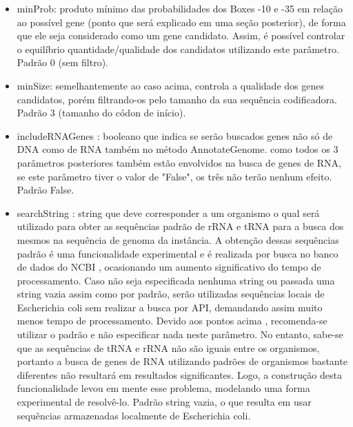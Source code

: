 \documentclass[brazilian,12pt,a4paper,final]{article}
\begin{document}
	\vspace{0.5cm}
		
	\begin{itemize}
		\item minProb: produto mínimo das probabilidades dos Boxes -10 e -35 em relação ao possível gene (ponto
						que será explicado em uma seção posterior), de forma que ele seja
						considerado como um gene candidato. Assim, é possível controlar o equilíbrio quantidade/qualidade
						dos candidatos utilizando este parâmetro. Padrão 0 (sem filtro).
						
		\item minSize: semelhantemente ao caso acima, controla a qualidade dos genes candidatos, porém filtrando-os pelo
						tamanho da sua sequência codificadora. Padrão 3 (tamanho do códon de início).
						
		\item includeRNAGenes : booleano que indica se serão buscados genes não só de DNA como de RNA também no método 
								AnnotateGenome. como todos os 3 parâmetros posteriores também estão envolvidos na busca
								de genes de RNA, se este parâmetro tiver o valor de "False", os três não terão nenhum efeito.
								Padrão False.
		\item  searchString : string que deve corresponder a um organismo o qual será utilizado para obter as sequências padrão
								de rRNA e tRNA para a busca dos mesmos na sequência de genoma da instância. A obtenção dessas 
								sequências padrão é uma funcionalidade experimental e é realizada por busca no banco de dados do NCBI
								, ocasionando um aumento significativo do tempo de processamento. Caso não seja especificada nenhuma string
								ou passada uma string vazia assim como por padrão, serão utilizadas sequências locais de Escherichia coli sem 
								realizar a busca por API, demandando assim muito menos tempo de processamento. Devido aos pontos acima
								, recomenda-se utilizar o padrão e não especificar nada neste parâmetro. No entanto, sabe-se que as sequências
								de tRNA e rRNA não são iguais entre os organismos, portanto a busca de genes de RNA utilizando padrões
								de organismos bastante diferentes não resultará em resultados significantes. Logo, a construção desta funcionalidade
								levou em mente esse problema, modelando uma forma experimental de resolvê-lo.
								Padrão string vazia, o que resulta em usar sequências armazenadas
								localmente de Escherichia coli.
								

\end{itemize}
\end{document}
